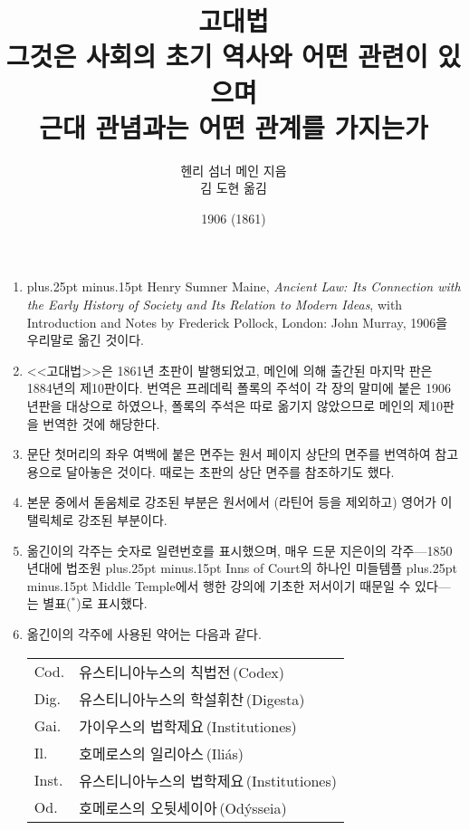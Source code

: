 \documentclass[b5paper]{book}
\def\latinmarks{\hangulpunctuations=0
    \aftergroup\hangulpunctuations\aftergroup1\aftergroup\relax }
\def\latin#1{\ifnum\lastskip=0 \penalty50 \hskip0pt plus.25pt minus.15pt\fi
  \begingroup\latinmarks\footnotesize #1\endgroup}
\def\paren#1{\begingroup\small(#1)\endgroup}
\begin{document}
\title{고대법\\
\large 그것은 사회의 초기 역사와 어떤 관련이 있으며\\
근대 관념과는 어떤 관계를 가지는가}
\author{헨리 섬너 메인 지음\\
김 도현 옮김}
\date{1906 (1861)}

\frontmatter

\maketitle

\null\vfill
\thispagestyle{empty}
\begin{enumerate}
    \small
  \item \latin{\small
    Henry Sumner Maine, \textit{Ancient Law: Its Connection with
    the Early History of Society and Its Relation to Modern Ideas}, with
    Introduction and Notes by Frederick Pollock, London: John Murray,
    1906}을 우리말로 옮긴 것이다.
  \item <<고대법>>은 1861년 초판이 발행되었고,
    메인에 의해 출간된 마지막 판은 1884년의 제10판이다.
    번역은 프레데릭 폴록의 주석이
    각 장의 말미에 붙은 1906년판을 대상으로 하였으나,
    폴록의 주석은 따로 옮기지 않았으므로
    메인의 제10판을 번역한 것에 해당한다.
  \item 문단 첫머리의 좌우 여백에 붙은 면주는 원서 페이지 상단의 면주를
    번역하여
    참고용으로
    달아놓은 것이다.
    때로는 초판의 상단 면주를 참조하기도 했다.
  \item 본문 중에서 돋움체로 강조된 부분은
    원서에서 \paren{라틴어 등을 제외하고} 영어가
    이탤릭체로 강조된 부분이다.
  \item 옮긴이의 각주는 숫자로 일련번호를 표시했으며,
    매우 드문 지은이의 각주---1850년대에 법조원\latin{Inns of Court}의
    하나인 미들템플\latin{Middle Temple}에서
    행한 강의에 기초한 저서이기 때문일 수 있다---는
    별표($^*$)로 표시했다.
  \item 옮긴이의 각주에 사용된 약어는 다음과 같다.

    \begin{tabular}{l@{ $=$ }l}
      Cod.  & 유스티니아누스의 칙법전\,(Codex) \\
      Dig.  & 유스티니아누스의 학설휘찬\,(Digesta) \\
      Gai.  & 가이우스의 법학제요\,(Institutiones) \\
      Il.   & 호메로스의 일리아스\,(Iliás) \\
      Inst. & 유스티니아누스의 법학제요\,(Institutiones) \\
      Od.   & 호메로스의 오뒷세이아\,(Odýsseia) \\
    \end{tabular}
\end{enumerate}
\end{document}
